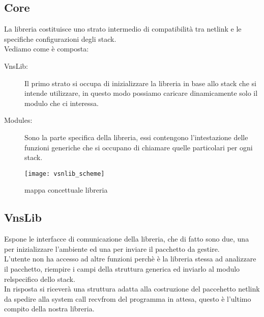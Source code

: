 \subsection{Core}
La libreria costituisce uno strato  intermedio di compatibilit\`a tra netlink e le specifiche configurazioni degli stack.\\
Vediamo come \`e composta:
\begin{description}                     %
  \item[VnsLib:] Il primo strato si occupa di inizializzare la libreria in base allo stack che si intende utilizzare, in questo modo possiamo caricare dinamicamente solo il modulo che ci interessa.
  \item[Modules:] Sono la parte specifica della libreria, essi contengono l'intestazione delle funzioni generiche che si occupano di chiamare quelle particolari per ogni stack.
\end{description}
\begin{figure}[h]                       %
\begin{center}                          %
\texttt{[image: vsnlib\_scheme]}%
%
\caption[mappa concettuale libreria]{mappa concettuale libreria}\label{fig:map}
\end{center}
\end{figure}
\subsection{VnsLib}
Espone le interfacce di comunicazione della libreria, che di fatto sono due, una per inizializzare l'ambiente ed una per inviare il pacchetto da gestire.\\
L'utente non ha accesso ad altre funzioni perch\`e \`e la libreria stessa ad analizzare il pacchetto, riempire i campi della struttura generica ed inviarlo al modulo relspecifico dello stack.\\
In risposta si ricever\`a una struttura adatta alla costruzione del paccehetto netlink da spedire alla system call recvfrom del programma in attesa, questo \`e l'ultimo compito della nostra libreria.
